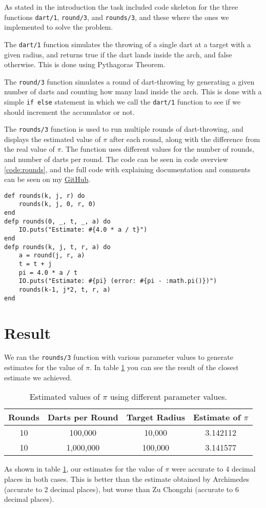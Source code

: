 \documentclass[a4paper,11pt]{article}
\newenvironment{code}{\captionsetup{type=listing}}{}
\begin{document}
As stated in the introduction the task included code skeleton for the three functions \texttt{dart/1}, \texttt{round/3}, 
and \texttt{rounds/3}, and these where the ones we implemented to solve the problem.

The \texttt{dart/1} function simulates the throwing of a single dart at a target with a given radius, and returns true if 
the dart lands inside the arch, and false otherwise. This is done using Pythagoras Theorem. 

The \texttt{round/3} function simulates a round of dart-throwing by generating a given number of darts and counting how 
many land inside the arch. This is done with a simple \texttt{if else} statement in which we call the \texttt{dart/1} function
to see if we should increment the accumulator or not.

The \texttt{rounds/3} function is used to run multiple rounds of dart-throwing, and displays the estimated value of $\pi$ after 
each round, along with the difference from the real value of $\pi$. The function uses different values for the number of rounds, 
and number of darts per round. The code can be seen in code overview \ref{code:rounds}, and the full code with explaining 
documentation and comments can be seen on my \href{https://github.com/adrian-jonsson-sjoedin/ID1019-Programming-II/tree/main/Task6_Solution}{GitHub}.
\begin{code}
\label{code:rounds}
\begin{verbatim}
def rounds(k, j, r) do
    rounds(k, j, 0, r, 0)
end
defp rounds(0, _, t, _, a) do
    IO.puts("Estimate: #{4.0 * a / t}")
end
defp rounds(k, j, t, r, a) do
    a = round(j, r, a)
    t = t + j
    pi = 4.0 * a / t 
    IO.puts("Estimate: #{pi} (error: #{pi - :math.pi()})")
    rounds(k-1, j*2, t, r, a) 
end
\end{verbatim}
\end{code}

\section*{Result}
We ran the \texttt{rounds/3} function with various parameter values to generate estimates for the value of $\pi$. 
In table \ref{table:results} you can see the result of the closest estimate we achieved.

\begin{table}[h]
\centering
\begin{tabular}{|c|c|c|c|}
\hline
\textbf{Rounds} & \textbf{Darts per Round} & \textbf{Target Radius} & \textbf{Estimate of $\pi$} \\
\hline
10 & 100,000 & 10,000 & 3.142112 \\
10 & 1,000,000 & 100,000 & 3.141577 \\
\hline
\end{tabular}
\caption{Estimated values of $\pi$ using different parameter values.}
\label{table:results}
\end{table}
As shown in table \ref{table:results}, our estimates for the value of $\pi$ were accurate to 4 decimal places in both cases. 
This is better than the estimate obtained by Archimedes (accurate to 2 decimal places), but worse than Zu Chongzhi 
(accurate to 6 decimal places).
\end{document}
